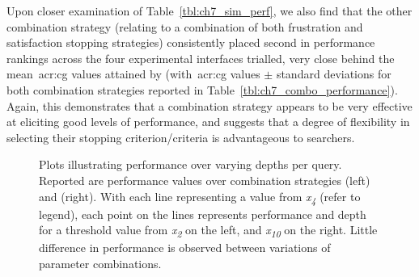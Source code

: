 Upon closer examination of Table~\ref{tbl:ch7_sim_perf}, we also find that the other combination strategy  (relating to a combination of both frustration and satisfaction stopping strategies) consistently placed second in performance rankings across the four experimental interfaces trialled, very close behind the mean~\gls{acr:cg} values attained by  (with~\gls{acr:cg} values $\pm$ standard deviations for both combination strategies reported in Table~\ref{tbl:ch7_combo_performance}). Again, this demonstrates that a combination strategy appears to be very effective at eliciting good levels of performance, and suggests that a degree of flexibility in selecting their stopping criterion/criteria is advantageous to searchers.


\begin{figure}[t!]
    \centering
    \caption[\emph{What-if} performance over combination stopping strategies]{Plots illustrating performance over varying depths per query. Reported are performance values over combination strategies  (left) and  (right). With each line representing a value from \emph{x\textsubscript{4}} (refer to legend), each point on the lines represents performance and depth for a threshold value from \emph{x\textsubscript{2}} on the left, and \emph{x\textsubscript{10}} on the right. Little difference in performance is observed between variations of parameter combinations.}
    \label{fig:ch7_sim_perf_plots_combo}
\end{figure}


